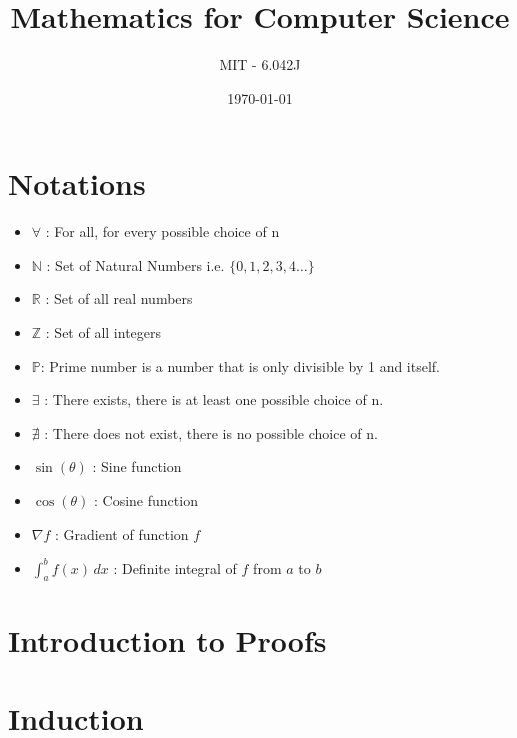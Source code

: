 \documentclass[12pt]{article}
\title{\textbf{Mathematics for Computer Science}}
\author{MIT - 6.042J}
\date{\today}
\begin{document}
\maketitle



\tableofcontents
\newpage

\section*{Notations}
\begin{itemize}
    \item $\forall$ : For all, for every possible choice of n
    \item $\mathbb{N}$ : Set of Natural Numbers i.e. $\{0, 1, 2, 3, 4 \ldots\}$
    \item $\mathbb{R}$ : Set of all real numbers
    \item $\mathbb{Z}$ : Set of all integers
    \item $\mathbb{P}$: Prime number is a number that is only divisible by 1 and itself.
    \item $\exists$ : There exists, there is at least one possible choice of n.
    \item $\nexists$ : There does not exist, there is no possible choice of n.
    \item $\sin(\theta)$ : Sine function
    \item $\cos(\theta)$ : Cosine function
    \item $\nabla f$ : Gradient of function $f$
    \item $\int_a^b f(x) \, dx$ : Definite integral of $f$ from $a$ to $b$
\end{itemize}



\newpage

\section{Introduction to Proofs}


\section{Induction}

\end{document}
